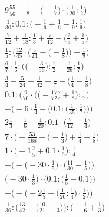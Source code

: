 \documentclass[8pt]{article}
\begin{document}
\begin{align}
9\frac{55}{56} - \frac{1}{8} - \big(-\frac{1}{7}\big) \cdot \big(\frac{1}{20} : \frac{1}{2}\big) \\
\frac{1}{30} : 0.1 : \big(-\frac{1}{6} + \frac{1}{6} - \frac{1}{9} : \frac{1}{9}\big) \\
\frac{7}{12} + \frac{1}{18} : \frac{1}{3} + \frac{7}{12} - \big(\frac{2}{9} + \frac{1}{9}\big) \\
\frac{1}{5} : \bigg(\frac{12}{45} \cdot \Big(\frac{5}{24} - \big(-\frac{1}{8}\big)\Big) + \frac{1}{9}\bigg) \\
\frac{6}{7} \cdot \frac{1}{6} : \Big(\big(-\frac{3}{56}\big) : \frac{1}{2} + \frac{1}{28} : \frac{1}{7}\Big) \\
\frac{3}{4} + \frac{5}{24} + \frac{1}{42} + \frac{1}{7} - \big(\frac{1}{4} - \frac{1}{8}\big) \\
0.1 : \bigg(\frac{9}{70} \cdot \Big(\big(-\frac{17}{72}\big) + \frac{1}{8}\Big) : \frac{1}{7}\bigg) \\
-\bigg(-6 \cdot \frac{1}{4} - \Big(0.1 : \big(\frac{1}{35} : \frac{1}{7}\big)\Big)\bigg) \\
2\frac{1}{3} + \frac{1}{6} + \frac{1}{20} : 0.1 \cdot \big(\frac{7}{12} - \frac{1}{4}\big) \\
7 \cdot \Big(-\frac{53}{168} - \big(-\frac{1}{3}\big) + \frac{1}{4} - \frac{1}{8}\Big) \\
1 \cdot \big(-1\frac{2}{5} + 0.1 \cdot \frac{1}{6}\big) : \frac{1}{4} \\
-\Big(-\big(-30 \cdot \frac{1}{5}\big) \cdot \big(\frac{11}{30} - \frac{1}{5}\big)\Big) \\
\Big(-30 \cdot \frac{1}{3}\Big) \cdot \Big(0.1 : \big(\frac{1}{5} - 0.1\big)\Big) \\
-\bigg(-\Big(-2\frac{1}{5} - \big(\frac{1}{20} : \frac{1}{4}\big) \cdot \frac{1}{2}\Big)\bigg) \\
\frac{1}{36} : \Big(\frac{13}{42} - \big(\frac{10}{21} - \frac{1}{3}\big)\Big) : \Big(-\frac{1}{6} + \frac{1}{3}\Big)
\end{align}
\end{document}
